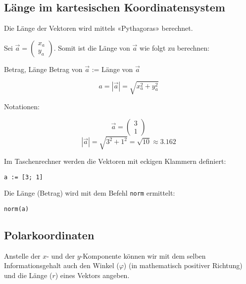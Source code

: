 \newpage




\newpage

\subsection{Länge im kartesischen Koordinatensystem}

Die Länge der Vektoren wird mittels «Pythagoras» berechnet.

Sei $\vec{a}  = \begin{pmatrix}x_a\\y_a\end{pmatrix}$. Somit ist die Länge von
    $\vec{a}$ wie folgt zu berechnen:

    \begin{gesetz}{Betrag, Länge}{}
      Betrag von $\vec{a}$ := Länge von $\vec{a}$

      $$a = |\vec{a}| = \sqrt{x_a^2 + y_a^2}$$
      \end{gesetz}
    Notationen:

    \begin{beispiel}{}{}
      $$ \vec{a}= \begin{pmatrix} 3\\ 1\end{pmatrix}$$
        $$|\vec{a}| = \sqrt{3^2+1^2} = \sqrt{10}\approx 3.162$$
      \end{beispiel}
    

    \begin{bemerkung}{}{}
      Im Taschenrechner werden die Vektoren mit eckigen Klammern
      definiert:

      \texttt{a := [3; 1]}

      Die Länge (Betrag) wird mit dem Befehl \texttt{norm} ermittelt:

      \texttt{norm(a)}
    \end{bemerkung}

\newpage

\subsection{Polarkoordinaten}


\newpage

Anstelle der $x$- und der $y$-Komponente können wir mit dem selben
Informationsgehalt auch den Winkel ($\varphi$)
(in mathematisch positiver Richtung) und die Länge ($r$) eines Vektors
angeben.

